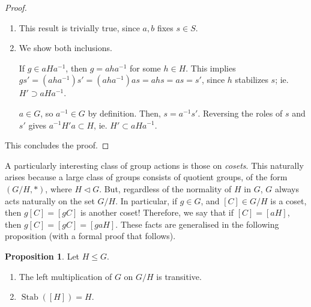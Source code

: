 \documentclass[11pt]{amsart} %
\theoremstyle{definition}
\newtheorem{proposition}[definition]{Proposition}
\theoremstyle{definition}
\DeclareMathOperator{\stab}{Stab}
\numberwithin{equation}{section}
\begin{document}
\begin{proof}
	\begin{enumerate}
		\item This result is trivially true, since $a,b$ fixes $s \in S$.
		\item We show both inclusions.
		
		If $g \in a H a^{-1}$, then $g = aha^{-1}$ for some $h \in H$. This implies $g s' = (aha^{-1})s' = (aha^{-1}) as = ahs = as = s'$, since $h$ stabilizes $s$; ie. $H' \supset aHa^{-1}$.
		
		$a \in G$, so $a^{-1} \in G$ by definition. Then, $s=a^{-1} s'$. Reversing the roles of $s$ and $s'$ gives $a^{-1} H' a \subset H$, ie. $H' \subset aHa^{-1}$.
	\end{enumerate}
	This concludes the proof.
\end{proof}




A particularly interesting class of group actions is those on \textit{cosets}. This naturally arises because a large class of groups consists of quotient groups, of the form $(G / H, *)$, where $H \lhd G$. But, regardless of the normality of $H $ in $G$, $G$ always acts naturally on the set $G / H$. In particular, if $g \in G$, and $[C] \in G/H$ is a coset, then $g[C] = [gC] $ is another coset! Therefore, we say that if $[C] = [aH]$, then $g[C] =[gC] = [gaH]$. These facts are generalised in the following proposition (with a formal proof that follows).

\begin{proposition}
	\label{proppropertiesoftransitivegroupaction}
	Let $H \leq G$. 
	\begin{enumerate}
		\item The left multiplication of $G$ on $G/H$ is transitive.
		\item $\stab([H]) = H$.
	\end{enumerate}
\end{proposition}
\end{document}
